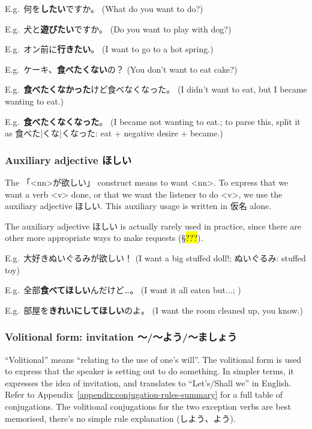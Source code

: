 \documentclass[../nihongo-gakushuu-kyouzai-grammar.tex]{subfiles}
\begin{document}
E.g.\ 何を\textbf{したい}ですか。 (What do you want to do?)

E.g.\ 犬と\textbf{遊びたい}ですか。 (Do you want to play with dog?)

E.g.\ オン前に\textbf{行きたい}。 (I want to go to a hot spring.)

E.g.\ ケーキ、\textbf{食べたくない}の？ (You don't want to eat cake?)

E.g.\ \textbf{食べたくなかった}けど食べなくなった。 (I didn't want to eat, but I became wanting to eat.)

E.g.\ \textbf{食べたくなくなった}。 (I became not wanting to eat.; to parse this, split it as 食べた|くな|くなった: eat + negative desire + became.)


\subsubsection{Auxiliary adjective ほしい} \label{sec:auxiliary-adjective-hoshii}
The 「<nn>が欲しい」 construct means to want <nn>. To express that we want a verb <v> done, or that we want the listener to do <v>, we use the auxiliary adjective ほしい. This auxiliary usage is written in 仮名 alone.

The auxiliary adjective ほしい is actually rarely used in practice, since there are other more appropriate ways to make requests (\S\hl{???}).

E.g.\ 大好きぬいぐるみが欲しい！ (I want a big stuffed doll!; ぬいぐるみ: stuffed toy)

E.g.\ 全部\textbf{食べてほしい}んだけど\dots。 (I want it all eaten but...; )

E.g.\ 部屋を\textbf{きれいにしてほしい}のよ。 (I want the room cleaned up, you know.)


\subsubsection{Volitional form: invitation 〜/〜よう/〜ましょう} \label{sec:volitional-form}
``Volitional'' means ``relating to the use of one's will''. The volitional form is used to express that the speaker is setting out to do something. In simpler terms, it expresses the idea of invitation, and translates to ``Let's/Shall we'' in English. Refer to Appendix~\ref{appendix:conjugation-rules-summary} for a full table of conjugations. The volitional conjugations for the two exception verbs are best memorised, there's no simple rule explanation (しよう、よう).
\end{document}

